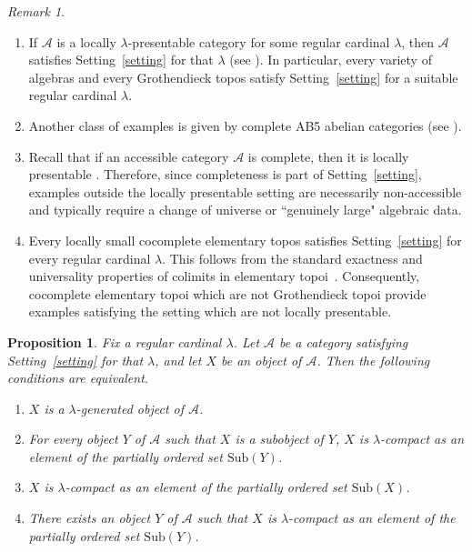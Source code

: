 \documentclass{amsproc}
\theoremstyle{definition}
\theoremstyle{plain}
\newtheorem{Prop}[theorem]{Proposition}
\theoremstyle{remark}
\newtheorem{remark}[theorem]{Remark}
\numberwithin{equation}{section}
\newcommand{\Cal}[1]{{\mathcal #1}}
\newcommand{\sub}[1]{\mathrm{Sub} (#1)}
\begin{document}
\begin{remark}
\begin{enumerate}
    \item
    If $\Cal A$ is a locally $\lambda$-presentable category for some regular cardinal $\lambda$, then $\Cal A$ satisfies Setting~\ref{setting} for that $\lambda$ (see \cite[Chapter~1]{adamek-rosicky}). In particular, every variety of algebras and every Grothendieck topos satisfy Setting~\ref{setting} for a suitable regular cardinal $\lambda$.
    \item 
    Another class of examples is given by complete AB5 abelian categories (see \cite[Chapter~2, Theorem~8.6]{Popescu-abelian}).
    \item
    Recall that if an accessible category $\Cal A$ is complete, then it is locally presentable \cite[Corollary~2.47]{adamek-rosicky}. Therefore, since completeness is part of Setting~\ref{setting}, examples outside the locally presentable setting are necessarily non-accessible and typically require a change of universe or ``genuinely large" algebraic data.
    \item
    Every locally small cocomplete elementary topos satisfies Setting~\ref{setting} for every regular cardinal $\lambda$. This follows from the standard exactness and universality properties of colimits in elementary topoi~\cite[Chapter~5]{BorceuxHandbook3}. Consequently, cocomplete elementary topoi which are not Grothendieck topoi provide examples satisfying the setting which are not locally presentable.
\end{enumerate}
\end{remark}

\begin{Prop}\label{compact=fg} Fix a regular cardinal $\lambda$. Let $\mathscr A$ be a category satisfying Setting~\ref{setting} for that $\lambda$, and let $X$ be an object of $\mathscr A$. Then the following conditions are equivalent. 
    \begin{enumerate}
        \item $X$ is a $\lambda$-generated object of $\mathscr A$.
        \item For every object $Y$ of $\mathscr{A}$ such that $X$ is a subobject of $Y$, $X$ is $\lambda$-compact as an element of the partially ordered set $\sub Y$.
        \item 
        $X$ is $\lambda$-compact as an element of the partially ordered set $\sub X$.
        \item 
        There exists an object $Y$ of $\mathscr A$ such that $X$ is $\lambda$-compact as an element of the partially ordered set $\sub Y$.
    \end{enumerate}
\end{Prop}
\end{document}

